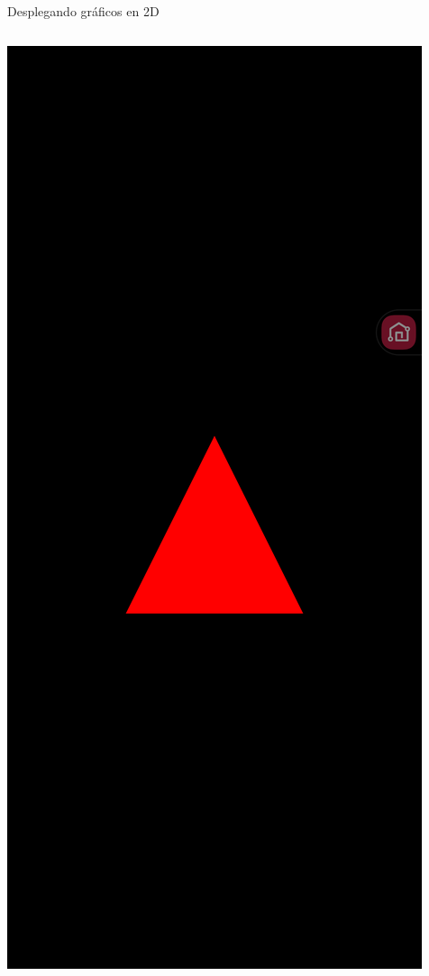 \documentclass[aspectratio=169,compress]{beamer}
\begin{document}
\begin{frame}{Desplegando gráficos en 2D}
\begin{columns}
\begin{column}{0.2\textwidth}
\begin{center}
\includegraphics[width=1.0\linewidth]{PantallazosDemoTaller/Demo01.png}
\end{center}
\end{column}
\end{columns}


\end{frame}
\end{document}
